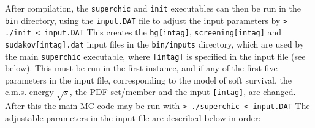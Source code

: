 \documentclass[12pt]{article}
\begin{document}
After compilation, the  \texttt{superchic} and \texttt{init} executables can then be run in the \texttt{bin} directory, using the \texttt{input.DAT} file to adjust the input parameters by
\newline
\newline
\texttt{> ./init < input.DAT}
\newline
\newline
This creates the \texttt{hg[intag]}, \texttt{screening[intag]} and \texttt{sudakov[intag]}\texttt{.dat} input files in the \texttt{bin/inputs} directory, which are used by the main \texttt{superchic} executable, where \texttt{[intag]} is specified in the input file (see below). This must be run in the first instance, and if any of the first five parameters in the input file, corresponding to the model of soft survival, the c.m.s. energy $\sqrt{s}$, the PDF set/member and the input \texttt{[intag]}, are changed. After this the main MC code may be run with
\newline
\newline
\texttt{> ./superchic < input.DAT}
\newline
\newline
The adjustable parameters in the input file are described below in order:
\end{document}
